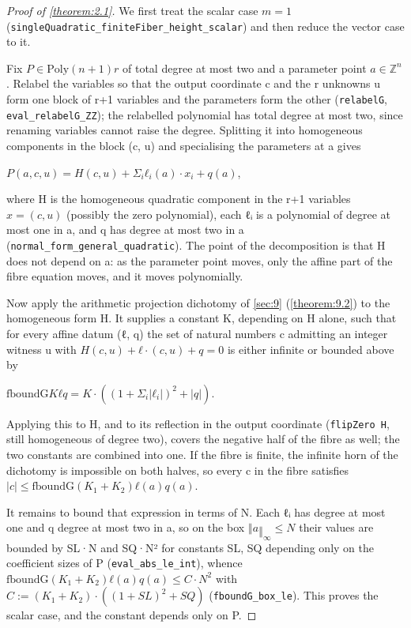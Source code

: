 \documentclass[11pt]{article}
\theoremstyle{plain}
\theoremstyle{definition}
\theoremstyle{remark}
\theoremstyle{plain}
\theoremstyle{definition}
\theoremstyle{remark}
\theoremstyle{plain}
\theoremstyle{definition}
\theoremstyle{remark}
\begin{document}
\begin{proof}[Proof of \cref{theorem:2.1}]
We first treat the scalar case $m = 1$ (\texttt{singleQuadratic\_\allowbreak{}finiteFiber\_\allowbreak{}height\_\allowbreak{}scalar}) and then reduce the vector case to it.

Fix $P ∈ \mathrm{Poly} (n+1) r$ of total degree at most two and a parameter point $a ∈ ℤ^{n}$. Relabel the variables so that the output coordinate c and the r unknowns u form one block of r+1 variables and the parameters form the other (\texttt{relabelG}, \texttt{eval\_\allowbreak{}relabelG\_\allowbreak{}ZZ}); the relabelled polynomial has total degree at most two, since renaming variables cannot raise the degree. Splitting it into homogeneous components in the block (c, u) and specialising the parameters at a gives

$P(a, c, u) = H(c,u) + Σ_{i} ℓ_{i}(a)·x_{i} + q(a)$,

where H is the homogeneous quadratic component in the r+1 variables $x = (c, u)$ (possibly the zero polynomial), each ℓᵢ is a polynomial of degree at most one in a, and q has degree at most two in a (\texttt{normal\_\allowbreak{}form\_\allowbreak{}general\_\allowbreak{}quadratic}). The point of the decomposition is that H does not depend on a: as the parameter point moves, only the affine part of the fibre equation moves, and it moves polynomially.

Now apply the arithmetic projection dichotomy of \cref{sec:9} (\cref{theorem:9.2}) to the homogeneous form H. It supplies a constant K, depending on H alone, such that for every affine datum (ℓ, q) the set of natural numbers c admitting an integer witness u with $H(c,u) + ℓ·(c,u) + q = 0$ is either infinite or bounded above by

$\mathrm{fboundG} K ℓ q = K·((1 + Σ_{i}|ℓ_{i}|)^{2} + |q|)$.

Applying this to H, and to its reflection in the output coordinate (\texttt{flipZero H}, still homogeneous of degree two), covers the negative half of the fibre as well; the two constants are combined into one. If the fibre is finite, the infinite horn of the dichotomy is impossible on both halves, so every c in the fibre satisfies $|c| ≤ \mathrm{fboundG} (K_{1}+K_{2}) ℓ(a) q(a)$.

It remains to bound that expression in terms of N. Each ℓᵢ has degree at most one and q degree at most two in a, so on the box $‖a‖_{∞} ≤ N$ their values are bounded by SL·N and SQ·N² for constants SL, SQ depending only on the coefficient sizes of P (\texttt{eval\_\allowbreak{}abs\_\allowbreak{}le\_\allowbreak{}int}), whence $\mathrm{fboundG} (K_{1}+K_{2}) ℓ(a) q(a) ≤ C·N^{2}$ with $C := (K_{1}+K_{2})·((1+SL)^{2} + SQ)$ (\texttt{fboundG\_\allowbreak{}box\_\allowbreak{}le}). This proves the scalar case, and the constant depends only on P.


\end{proof}
\end{document}
